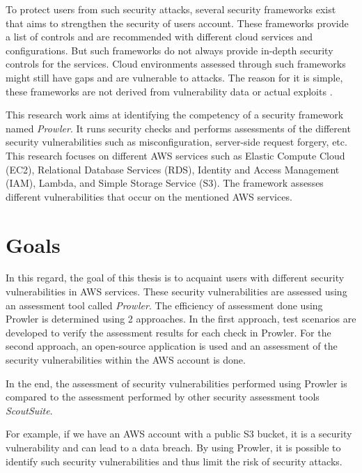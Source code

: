 \par  To protect users from such security attacks, several security frameworks exist that aims to strengthen the
security of users account. These frameworks provide a list of controls and are recommended with different cloud services and
configurations. But such frameworks do not always provide in-depth security controls for the services. Cloud
environments assessed through such frameworks might still have gaps and are vulnerable to attacks. The reason for it
is simple, these frameworks are not derived from vulnerability data or actual exploits \cite{10}.

\par This research work aims at identifying the competency of a security framework named \textit{Prowler}. It runs security checks and performs assessments of the different security vulnerabilities such as misconfiguration,
server-side request forgery, etc. This research focuses on different AWS services such as Elastic Compute Cloud (EC2), Relational Database Services (RDS), Identity and Access Management (IAM), Lambda, and Simple Storage Service (S3). The framework assesses different vulnerabilities that occur on the mentioned AWS services.



\section{Goals}
\par In this regard, the goal of this thesis is to acquaint users with different security vulnerabilities in AWS
services. These security vulnerabilities are assessed using an assessment tool called \textit{Prowler}. The
efficiency of assessment done using Prowler is determined using 2 approaches. In the first approach, test scenarios
are developed to verify the assessment results for each check in Prowler. For the second approach, an open-source
application is used and an assessment of the security vulnerabilities within the AWS account is done.

\par In the end, the assessment of security vulnerabilities performed using Prowler is compared to the assessment performed by other security assessment tools \textit{ScoutSuite}.

\par For example, if we have an AWS account with a public S3 bucket, it is a security vulnerability and can lead to a data breach. By using Prowler, it is possible to identify such security vulnerabilities and thus limit the risk of security attacks.

